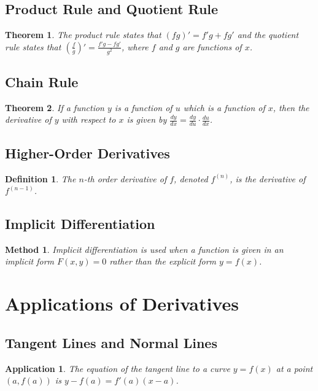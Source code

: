 \documentclass[a4paper,12pt]{book}
\newtheorem{theorem}{Theorem}
\newtheorem{application}{Application}
\newtheorem{definition}{Definition}
\newtheorem{method}{Method}
\begin{document}
\subsection{Product Rule and Quotient Rule}
\begin{theorem}
The product rule states that \( (fg)' = f'g + fg' \) and the quotient rule states that \( \left(\frac{f}{g}\right)' = \frac{f'g - fg'}{g^2} \), where \( f \) and \( g \) are functions of \( x \).
\end{theorem}

\subsection{Chain Rule}
\begin{theorem}
If a function \( y \) is a function of \( u \) which is a function of \( x \), then the derivative of \( y \) with respect to \( x \) is given by \( \frac{dy}{dx} = \frac{dy}{du} \cdot \frac{du}{dx} \).
\end{theorem}

\subsection{Higher-Order Derivatives}
\begin{definition}
The \( n \)-th order derivative of \( f \), denoted \( f^{(n)} \), is the derivative of \( f^{(n-1)} \).
\end{definition}

\subsection{Implicit Differentiation}
\begin{method}
Implicit differentiation is used when a function is given in an implicit form \( F(x, y) = 0 \) rather than the explicit form \( y = f(x) \).
\end{method}

\section{Applications of Derivatives}
\subsection{Tangent Lines and Normal Lines}
\begin{application}
The equation of the tangent line to a curve \( y = f(x) \) at a point \( (a, f(a)) \) is \( y - f(a) = f'(a)(x - a) \).
\end{application}
\end{document}
